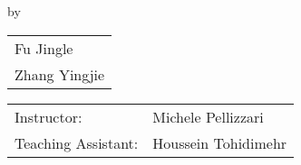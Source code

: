 \begin{titlepage}

\begin{center}

{\makeatletter
\largetitlestyle\fontsize{45}{45}\selectfont\@title
\makeatother}

{\makeatletter
\ifdefvoid{\@subtitle}{}{\bigskip\titlestyle\fontsize{20}{20}\selectfont\@subtitle}
\makeatother}

\bigskip
\bigskip

by

\bigskip
\bigskip

{\makeatletter
\largetitlestyle\fontsize{25}{25}\selectfont\@author
\makeatother}

\bigskip
\bigskip

\setlength\extrarowheight{2pt}
\begin{tabular}{l}
    Fu Jingle \\
    Zhang Yingjie \\
\end{tabular}

\vfill

\begin{tabular}{ll}
    Instructor: & Michele Pellizzari \\
    Teaching Assistant: & Houssein Tohidimehr \\
\end{tabular}

\bigskip
\bigskip


\end{center}


\end{titlepage}
